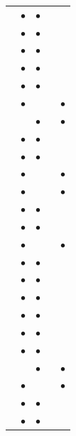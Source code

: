 \begin{longtable}{@{}>{\raggedright\arraybackslash}p{6.0cm} cccc@{}}
\cite{barbieri2021content} & $\bullet$ & $\bullet$ &  &  \\
\rowcolor{rowlight}\cite{barbieri2021tese} & $\bullet$ & $\bullet$ &  &  \\
\cite{beserra2020evaluating} & $\bullet$ & $\bullet$ &  &  \\
\rowcolor{rowlight}\cite{beserra2023multimodal} & $\bullet$ & $\bullet$ &  &  \\
\cite{cakmak2025tripss} & $\bullet$ & $\bullet$ &  &  \\
\rowcolor{rowlight}\cite{chasanis2008spectral} & $\bullet$ &  &  & $\bullet$ \\
\cite{chu2015video_cosummarization} &  & $\bullet$ &  & $\bullet$ \\
\rowcolor{rowlight}\cite{gharbi2017modularity} & $\bullet$ & $\bullet$ &  &  \\
\cite{gharbi2019repeatability} & $\bullet$ & $\bullet$ &  &  \\
\rowcolor{rowlight}\cite{gygli2014creating} & $\bullet$ &  &  & $\bullet$ \\
\cite{gygli2014summe} & $\bullet$ &  &  & $\bullet$ \\
\rowcolor{rowlight}\cite{hussain2021mvs} & $\bullet$ & $\bullet$ &  &  \\
\cite{kishi2019correlation} & $\bullet$ & $\bullet$ &  &  \\
\rowcolor{rowlight}\cite{messaoud2021deepqamvs} & $\bullet$ &  &  & $\bullet$ \\
\cite{nandini2022edgelbp} & $\bullet$ & $\bullet$ &  &  \\
\rowcolor{rowlight}\cite{over2008trecvid} & $\bullet$ & $\bullet$ &  &  \\
\cite{panda2017diversity} & $\bullet$ & $\bullet$ &  &  \\
\rowcolor{rowlight}\cite{qaroush2025diversity} & $\bullet$ & $\bullet$ &  &  \\
\cite{saqib2018mme} & $\bullet$ & $\bullet$ &  &  \\
\rowcolor{rowlight}\cite{sidiropoulos2011temporal} & $\bullet$ & $\bullet$ &  &  \\
\cite{song2015tvsum} &  & $\bullet$ &  & $\bullet$ \\
\rowcolor{rowlight}\cite{srinivas2016rank} & $\bullet$ &  &  & $\bullet$ \\
\cite{trojahn2021temporal} & $\bullet$ & $\bullet$ &  &  \\
\rowcolor{rowlight}\cite{wang2012tag_localization} & $\bullet$ & $\bullet$ &  &  \\

\end{longtable}
